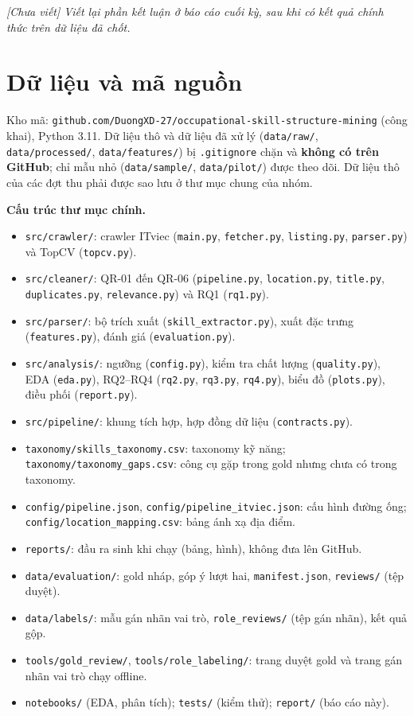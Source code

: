 \documentclass[12pt]{article}
\newcommand{\code}[1]{\texttt{#1}}
\newcommand{\chuaviet}[1]{%
\begin{tcolorbox}[colback=gray!8, colframe=gray!45, boxrule=0.4pt, arc=1pt]
\textit{[Chưa viết] #1}
\end{tcolorbox}}
\begin{document}
\chuaviet{Viết lại phần kết luận ở báo cáo cuối kỳ, sau khi có kết quả chính thức trên dữ liệu đã chốt.}

\newpage
\appendix
\section{Dữ liệu và mã nguồn}
\label{app:code}
Kho mã: \code{github.com/DuongXD-27/occupational-skill-structure-mining} (công khai), Python 3.11. Dữ liệu thô và dữ liệu đã xử lý (\code{data/raw/}, \code{data/processed/}, \code{data/features/}) bị \code{.gitignore} chặn và \textbf{không có trên GitHub}; chỉ mẫu nhỏ (\code{data/sample/}, \code{data/pilot/}) được theo dõi. Dữ liệu thô của các đợt thu phải được sao lưu ở thư mục chung của nhóm.

\textbf{Cấu trúc thư mục chính.}
\begin{itemize}[noitemsep, topsep=2pt, leftmargin=2.5em]
\item \code{src/crawler/}: crawler ITviec (\code{main.py}, \code{fetcher.py}, \code{listing.py}, \code{parser.py}) và TopCV (\code{topcv.py}).
\item \code{src/cleaner/}: QR-01 đến QR-06 (\code{pipeline.py}, \code{location.py}, \code{title.py}, \code{duplicates.py}, \code{relevance.py}) và RQ1 (\code{rq1.py}).
\item \code{src/parser/}: bộ trích xuất (\code{skill\_extractor.py}), xuất đặc trưng (\code{features.py}), đánh giá (\code{evaluation.py}).
\item \code{src/analysis/}: ngưỡng (\code{config.py}), kiểm tra chất lượng (\code{quality.py}), EDA (\code{eda.py}), RQ2--RQ4 (\code{rq2.py}, \code{rq3.py}, \code{rq4.py}), biểu đồ (\code{plots.py}), điều phối (\code{report.py}).
\item \code{src/pipeline/}: khung tích hợp, hợp đồng dữ liệu (\code{contracts.py}).
\item \code{taxonomy/skills\_taxonomy.csv}: taxonomy kỹ năng; \code{taxonomy/taxonomy\_gaps.csv}: công cụ gặp trong gold nhưng chưa có trong taxonomy.
\item \code{config/pipeline.json}, \code{config/pipeline\_itviec.json}: cấu hình đường ống; \code{config/location\_mapping.csv}: bảng ánh xạ địa điểm.
\item \code{reports/}: đầu ra sinh khi chạy (bảng, hình), không đưa lên GitHub.
\item \code{data/evaluation/}: gold nháp, góp ý lượt hai, \code{manifest.json}, \code{reviews/} (tệp duyệt).
\item \code{data/labels/}: mẫu gán nhãn vai trò, \code{role\_reviews/} (tệp gán nhãn), kết quả gộp.
\item \code{tools/gold\_review/}, \code{tools/role\_labeling/}: trang duyệt gold và trang gán nhãn vai trò chạy offline.
\item \code{notebooks/} (EDA, phân tích); \code{tests/} (kiểm thử); \code{report/} (báo cáo này).
\end{itemize}
\end{document}
